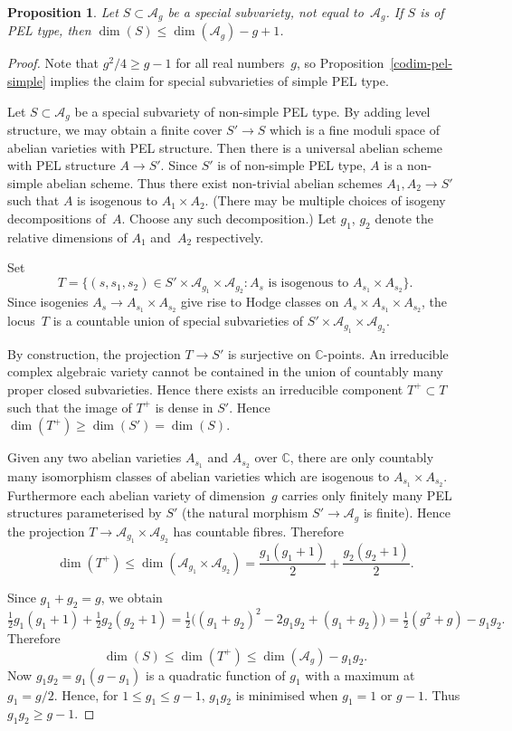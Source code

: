 \documentclass[11pt]{article}
\numberwithin{equation}{section}
\newcommand{\bC}{\mathbb{C}}
\newcommand{\cA}{\mathcal{A}}
\newcommand{\Ag}{\mathcal{A}_g}
\newtheorem{proposition}[lemma]{Proposition}
\begin{document}
\begin{proposition}\label{codim-pel}
Let $S \subset \Ag$ be a special subvariety, not equal to~$\Ag$.
If $S$ is of PEL type, then $\dim(S) \leq \dim(\Ag) - g + 1$.
\end{proposition}

\begin{proof}
Note that $g^2/4 \geq g-1$ for all real numbers~$g$, so Proposition~\ref{codim-pel-simple} implies the claim for special subvarieties of simple PEL type.

Let $S \subset \Ag$ be a special subvariety of non-simple PEL type.
By adding level structure, we may obtain a finite cover $S' \to S$ which is a fine moduli space of abelian varieties with PEL structure.
Then there is a universal abelian scheme with PEL structure $A \to S'$.
Since $S'$ is of non-simple PEL type, $A$ is a non-simple abelian scheme.
Thus there exist non-trivial abelian schemes $A_1, A_2 \to S'$ such that $A$ is isogenous to $A_1 \times A_2$. (There may be multiple choices of isogeny decompositions of~$A$. Choose any such decomposition.)
Let $g_1$, $g_2$ denote the relative dimensions of $A_1$ and~$A_2$ respectively.

Set
\[
T = \{ (s, s_1, s_2) \in S' \times \cA_{g_1} \times \cA_{g_2} : A_s \text{ is isogenous to } A_{s_1} \times A_{s_2} \}.
\]
Since isogenies $A_s \to A_{s_1} \times A_{s_2}$ give rise to Hodge classes on $A_s \times A_{s_1} \times A_{s_2}$, the locus~$T$ is a countable union of special subvarieties of $S' \times \cA_{g_1} \times \cA_{g_2}$.

By construction, the projection $T \to S'$ is surjective on $\bC$-points.
An irreducible complex algebraic variety cannot be contained in the union of countably many proper closed subvarieties.
Hence there exists an irreducible component $T^+ \subset T$ such that the image of $T^+$ is dense in $S'$.
Hence $\dim(T^+) \geq \dim(S') = \dim(S)$.

Given any two abelian varieties $A_{s_1}$ and $A_{s_2}$ over $\bC$, there are only countably many isomorphism classes of abelian varieties which are isogenous to $A_{s_1} \times A_{s_2}$.
Furthermore each abelian variety of dimension~$g$ carries only finitely many PEL structures parameterised by $S'$ (the natural morphism $S' \to \Ag$ is finite).
Hence the projection $T \to \cA_{g_1} \times \cA_{g_2}$ has countable fibres.
Therefore
\[
\dim(T^+) \leq \dim(\cA_{g_1} \times \cA_{g_2}) = \frac{g_1(g_1+1)}{2} + \frac{g_2(g_2+1)}{2}.
\]

Since $g_1+g_2=g$, we obtain
\[
\tfrac{1}{2}g_1(g_1+1) + \tfrac{1}{2}g_2(g_2+1)
= \tfrac{1}{2}\bigl( (g_1+g_2)^2 - 2g_1g_2 + (g_1+g_2) \bigr)
= \tfrac{1}{2}(g^2+g) - g_1g_2.
\]
Therefore
\[
\dim(S) \leq \dim(T^+) \leq \dim(\Ag) - g_1g_2.
\]
Now $g_1g_2 = g_1(g-g_1)$ is a quadratic function of $g_1$ with a maximum at $g_1=g/2$.
Hence, for $1 \leq g_1 \leq g-1$, $g_1g_2$ is minimised when $g_1 = 1$ or $g-1$.
Thus $g_1g_2 \geq g-1$.
\end{proof}
\end{document}
